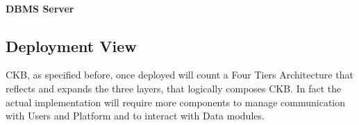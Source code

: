 \newpage

\paragraph{DBMS Server}

\newpage

\subsection{Deployment View}

CKB, as specified before, once deployed will count a Four Tiers Architecture that reflects and expands the three layers, that logically composes CKB.
In fact the actual implementation will require more components to manage communication with Users and Platform and to interact with Data modules.

